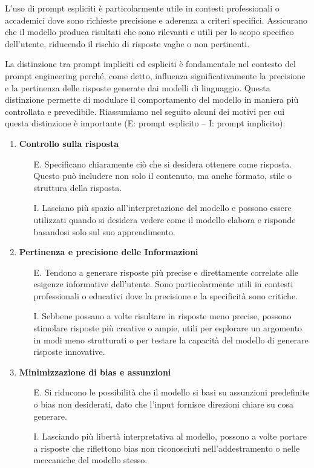             L'uso di prompt espliciti è particolarmente utile in contesti professionali o accademici dove sono richieste precisione e aderenza a criteri specifici. Assicurano che il modello produca risultati che sono rilevanti e utili per lo scopo specifico dell'utente, riducendo il rischio di risposte vaghe o non pertinenti.
            
            La distinzione tra prompt impliciti ed espliciti è fondamentale nel contesto del prompt engineering perché, come detto, influenza significativamente la precisione e la pertinenza delle risposte generate dai modelli di linguaggio. Questa distinzione permette di modulare il comportamento del modello in maniera più controllata e prevedibile. Riassumiamo nel seguito alcuni dei motivi per cui questa distinzione è importante (E: prompt esplicito – I: prompt implicito):
            \begin{enumerate}
                \item \textbf{Controllo sulla risposta}
                \begin{itemize}
                    \item[E.] Specificano chiaramente ciò che si desidera ottenere come risposta. Questo può includere non solo il contenuto, ma anche formato, stile o struttura della risposta.
                    \item[I.] Lasciano più spazio all'interpretazione del modello e possono essere utilizzati quando si desidera vedere come il modello elabora e risponde basandosi solo sul suo apprendimento.
                \end{itemize}

                \item \textbf{Pertinenza e precisione delle Informazioni}
                \begin{itemize}
                    \item[E.] Tendono a generare risposte più precise e direttamente correlate alle esigenze informative dell'utente. Sono particolarmente utili in contesti professionali o educativi dove la precisione e la specificità sono critiche.
                    \item[I.] Sebbene possano a volte risultare in risposte meno precise, possono stimolare risposte più creative o ampie, utili per esplorare un argomento in modi meno strutturati o per testare la capacità del modello di generare risposte innovative.
                \end{itemize}

                \item \textbf{Minimizzazione di bias e assunzioni}
                \begin{itemize}
                    \item[E.] Si riducono le possibilità che il modello si basi su assunzioni predefinite o bias non desiderati, dato che l'input fornisce direzioni chiare su cosa generare.
                    \item[I.] Lasciando più libertà interpretativa al modello, possono a volte portare a risposte che riflettono bias non riconosciuti nell'addestramento o nelle meccaniche del modello stesso.
                \end{itemize}


\end{enumerate}
